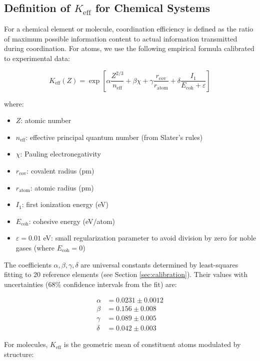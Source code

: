 \documentclass[12pt,a4paper]{article}
\theoremstyle{remark}
\newcommand{\Keff}{K_{\mathrm{eff}}}
\begin{document}
	\subsection{Definition of $\Keff$ for Chemical Systems}
	
	For a chemical element or molecule, coordination efficiency is defined as the ratio of maximum possible information content to actual information transmitted during coordination. For atoms, we use the following empirical formula calibrated to experimental data:
	
	\begin{equation}
		\Keff(Z) = \exp\left[\alpha \frac{Z^{2/3}}{n_{\text{eff}}} + \beta \chi + \gamma \frac{r_{\text{cov}}}{r_{\text{atom}}} + \delta \frac{I_1}{E_{\text{coh}} + \varepsilon}\right]
		\label{eq:keff-element}
	\end{equation}
	
	where:
	\begin{itemize}
		\item $Z$: atomic number
		\item $n_{\text{eff}}$: effective principal quantum number (from Slater's rules)
		\item $\chi$: Pauling electronegativity
		\item $r_{\text{cov}}$: covalent radius (pm)
		\item $r_{\text{atom}}$: atomic radius (pm)
		\item $I_1$: first ionization energy (eV)
		\item $E_{\text{coh}}$: cohesive energy (eV/atom)
		\item $\varepsilon = 0.01$ eV: small regularization parameter to avoid division by zero for noble gases (where $E_{\text{coh}} = 0$)
	\end{itemize}
	
	The coefficients $\alpha, \beta, \gamma, \delta$ are universal constants determined by least-squares fitting to 20 reference elements (see Section \ref{sec:calibration}). Their values with uncertainties (68\% confidence intervals from the fit) are:
	
	\begin{align}
		\alpha &= 0.0231 \pm 0.0012 \\
		\beta &= 0.156 \pm 0.008 \\
		\gamma &= 0.089 \pm 0.005 \\
		\delta &= 0.042 \pm 0.003
	\end{align}
	
	For molecules, $\Keff$ is the geometric mean of constituent atoms modulated by structure:
	
\end{document}
